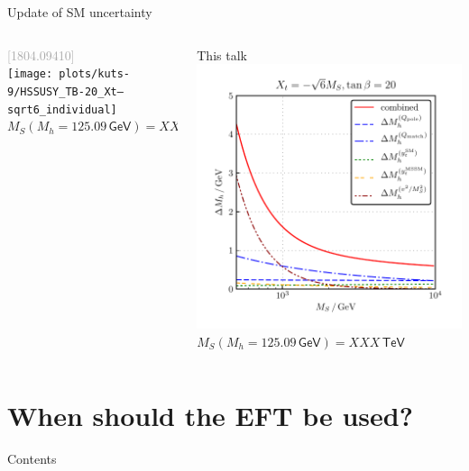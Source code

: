 \documentclass[hyperref={pdfpagelabels=false},ngerman]{beamer}
\newcommand{\eh}[1]{\,\mathsf{#1}}
\newcommand{\GeV}{\eh{GeV}}
\newcommand{\TeV}{\eh{TeV}}
\newcommand{\MS}{\ensuremath{M_S}}
\newcommand{\bigcite}[1]{\textcolor{darkgray}{[#1]}}
\begin{document}
\begin{frame}{Update of SM uncertainty}
  \begin{columns}
    \begin{column}{0.5\textwidth}
      \centering
      \bigcite{1804.09410}\\
      \texttt{[image: plots/kuts-9/HSSUSY\_TB-20\_Xt--sqrt6\_individual]}\\
      $\MS(M_h=125.09\GeV) = XXX\TeV$
    \end{column}
    \begin{column}{0.5\textwidth}
      \centering
      This talk\\
      \includegraphics[width=\textwidth]{plots/kuts-10/DMh_MS_individual}\\
      $\MS(M_h=125.09\GeV) = XXX\TeV$
    \end{column}
  \end{columns}
\end{frame}

\section{When should the EFT be used?}

\begin{frame}{Contents}
  \tableofcontents[currentsection]
\end{frame}
\end{document}
